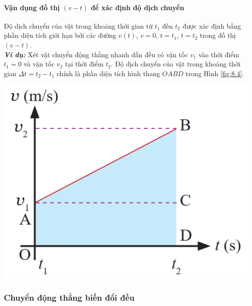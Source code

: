 \begin{tomtat}
	\paragraph{Vận dụng đồ thị $(v - t)$ để xác định độ dịch chuyển}
	Độ dịch chuyển của vật trong khoảng thời gian từ $t_1$ đến $t_2$ được xác định bằng phần diện tích giới hạn bởi các đường $v\left(t\right)$, $v=0$, $t=t_1$, $t=t_2$ trong đồ thị $\left(v - t\right)$.\\
	\textbf{\textit{Ví dụ:}} Xét vật chuyển động thẳng nhanh dần đều có vận tốc $v_1$ vào thời điểm $t_1=0$ và vận tốc $v_2$ tại thời điểm $t_2$. Độ dịch chuyển của vật trong khoảng thời gian $\Delta t= t_2-t_1$ chính là phần diện tích hình thang $OABD$ trong Hình \ref{fig:8.4}.
	\begin{center}
		\includegraphics[scale=0.5]{figs/G10Y25B6-1}
		\label{fig:8.4}
	\end{center}
\subsubsection{Chuyển động thẳng biến đổi đều}


\end{tomtat}

